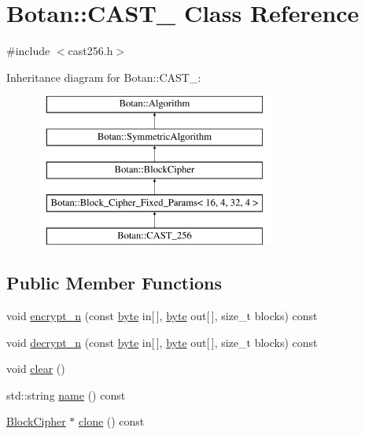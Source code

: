\hypertarget{classBotan_1_1CAST__256}{\section{Botan\-:\-:C\-A\-S\-T\-\_ Class Reference}
\label{classBotan_1_1CAST__256}
}


{\ttfamily \#include $<$cast256.\-h$>$}

Inheritance diagram for Botan\-:\-:C\-A\-S\-T\-\_\-:\begin{figure}[H]
\begin{center}
\leavevmode
\includegraphics[height=5.000000cm]{classBotan_1_1CAST__256}
\end{center}
\end{figure}
\subsection*{Public Member Functions}
\begin{DoxyCompactItemize}
\item 
void \hyperlink{classBotan_1_1CAST__256_a24d58dcb5aa6bbbc14003317f60253b1}{encrypt\-\_\-n} (const \hyperlink{namespaceBotan_a7d793989d801281df48c6b19616b8b84}{byte} in\mbox{[}$\,$\mbox{]}, \hyperlink{namespaceBotan_a7d793989d801281df48c6b19616b8b84}{byte} out\mbox{[}$\,$\mbox{]}, size\-\_\-t blocks) const 
\item 
void \hyperlink{classBotan_1_1CAST__256_a8ad71a961f3909ea0f42fa3911968c8d}{decrypt\-\_\-n} (const \hyperlink{namespaceBotan_a7d793989d801281df48c6b19616b8b84}{byte} in\mbox{[}$\,$\mbox{]}, \hyperlink{namespaceBotan_a7d793989d801281df48c6b19616b8b84}{byte} out\mbox{[}$\,$\mbox{]}, size\-\_\-t blocks) const 
\item 
void \hyperlink{classBotan_1_1CAST__256_abb2bdb9d97d573826084b84a5f5127f8}{clear} ()
\item 
std\-::string \hyperlink{classBotan_1_1CAST__256_a19fd8b29e21378072f0efedc2d883f00}{name} () const 
\item 
\hyperlink{classBotan_1_1BlockCipher}{Block\-Cipher} $\ast$ \hyperlink{classBotan_1_1CAST__256_a1de3ac38b13ee609da7442bbdc170245}{clone} () const 
\end{DoxyCompactItemize}
